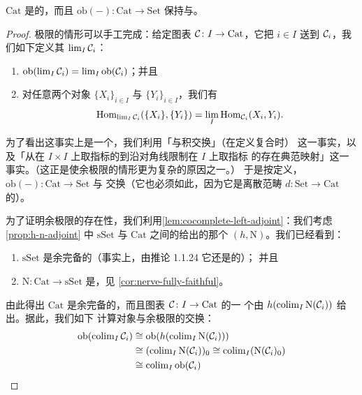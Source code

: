 \begin{proposition}\label{prop:cat-bicomplete}
\trCategory{} $\mathrm{Cat}$ 是\trBicomplete{}的，而且\trFunctor{}%
$\mathrm{ob}(-)\colon \mathrm{Cat} \to \mathrm{Set}$ 保持\trLimit{}与\trColimit{}。
\end{proposition}

\begin{proof}
极限的情形可以手工完成：给定图表 $\mathcal{C}\colon I \to \mathrm{Cat}$，它把 $i \in I$ 送到
$\mathcal{C}_i$，我们如下定义其\trLimit{} $\lim_I \mathcal{C}_i$：
\begin{enumerate}[label=(\arabic*)]
  \item $\mathrm{ob}(\lim_I \mathcal{C}_i) = \lim_I \mathrm{ob}(\mathcal{C}_i)$；并且
  \item 对任意两个对象 $\{X_i\}_{i \in I}$ 与 $\{Y_i\}_{i \in I}$，我们有
  \[
  \mathrm{Hom}_{\lim_I \mathcal{C}_i}(\{X_i\}, \{Y_i\}) =
  \lim_I \mathrm{Hom}_{\mathcal{C}_i}(X_i, Y_i).
  \]
\end{enumerate}
为了看出这事实上是一个\trCategory{}，我们利用「\trLimit{}与积交换」（在定义复合时）
这一事实，以及「从在 $I \times I$ 上取指标的\trLimit{}到沿对角线限制在 $I$ 上取指标
的\trLimit{}存在典范映射」这一事实。（这正是使余极限的情形更为复杂的原因之一。）
于是按定义，\trFunctor{} $\mathrm{ob}(-)\colon \mathrm{Cat} \to \mathrm{Set}$ 与\trLimit{}%
交换（它也必须如此，因为它是离散范畴\trFunctor{} $d\colon \mathrm{Set} \to \mathrm{Cat}$ 的\trRightAdjoint{}）。

为了证明余极限的存在性，我们利用\cref{lem:cocomplete-left-adjoint}：我们考虑
\cref{prop:h-n-adjoint} 中 $\mathrm{sSet}$ 与 $\mathrm{Cat}$ 之间的\trFunctor{}给出的那个%
\trAdjunction{} $(h, \mathrm{N})$。我们已经看到：
\begin{enumerate}[label=(\arabic*)]
  \item $\mathrm{sSet}$ 是余完备的（事实上，由推论 1.1.24 它还是\trBicomplete{}的）；
  并且
  \item $\mathrm{N}\colon \mathrm{Cat} \to \mathrm{sSet}$ 是\trFullyFaithful{}，见
  \cref{cor:nerve-fully-faithful}。
\end{enumerate}
由此得出 $\mathrm{Cat}$ 是余完备的，而且图表 $\mathcal{C}\colon I \to \mathrm{Cat}$ 的一
个\trColimit{}由 $h(\operatorname{colim}_I \mathrm{N}(\mathcal{C}_i))$ 给出。据此，我们如下
计算对象\trFunctor{}与余极限的交换：
\[
\begin{aligned}
\mathrm{ob}(\operatorname{colim}_I \mathcal{C}_i)
&\cong \mathrm{ob}(h(\operatorname{colim}_I \mathrm{N}(\mathcal{C}_i)))\\
&\cong (\operatorname{colim}_I \mathrm{N}(\mathcal{C}_i))_0
\cong \operatorname{colim}_I (\mathrm{N}(\mathcal{C}_i)_0)\\
&\cong \operatorname{colim}_I \mathrm{ob}(\mathcal{C}_i)
\end{aligned}
\]
\end{proof}

